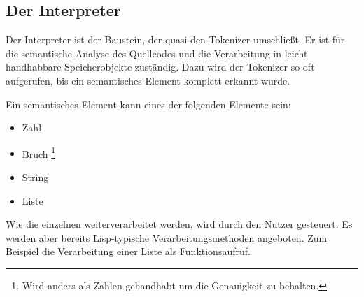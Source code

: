 \subsection{Der Interpreter}

Der Interpreter ist der Baustein, der quasi den Tokenizer umschließt.
Er ist für die semantische Analyse des Quellcodes und die Verarbeitung in
leicht handhabbare Speicherobjekte zuständig. Dazu wird der Tokenizer so oft
aufgerufen, bis ein semantisches Element komplett erkannt wurde.

Ein semantisches Element kann eines der folgenden Elemente sein:

\begin{itemize}
\item{Zahl}
\item{Bruch \footnote{Wird anders als Zahlen gehandhabt um die Genauigkeit zu behalten.}}
\item{String}
\item{Liste}
\end{itemize}

Wie die einzelnen weiterverarbeitet werden, wird durch den Nutzer gesteuert.
Es werden aber bereits Lisp-typische Verarbeitungsmethoden angeboten.
Zum Beispiel die Verarbeitung einer Liste als Funktionsaufruf.

